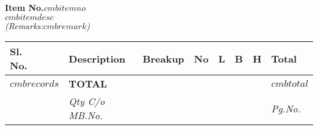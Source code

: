 
\noindent\textbf{Item No.$cmbitemno$}\\
\noindent $cmbitemdesc$\\
\noindent\emph{(Remarks:$cmbremark$)}\\
\vspace*{-\baselineskip}
\begin{longtabu} to \textwidth {|X[1,c]|X[10,l]|X[5,l]|X[3,r]|X[3,r]|X[3,r]|X[3,r]|X[3,r]|}
   \hline
    \textbf{Sl.\newline No.} & \textbf{Description} & \textbf{Breakup} & \textbf{No} & \textbf{L} & \textbf{B} & \textbf{H} & \textbf{Total} \\
   \hline
    \endhead
$cmbrecords$
    \hline
      & \textbf{TOTAL} & &  &  &  &  & \textbf{$cmbtotal$} \\
   \hline
      & \emph{Qty C/o MB.No. } &  &  &  &  &  & \emph{Pg.No. \pageref{$cmbcarriedover$}} \label{$cmblabel$} \\
   \hline
\end{longtabu}

